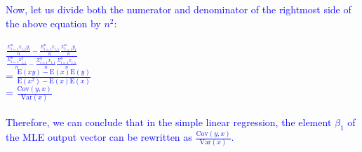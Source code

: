 \documentclass[letterpaper, 11pt]{article}
\begin{document}
\textcolor{blue}{
Now, let us divide both the numerator and denominator of the rightmost side of the above equation by $n^{2}$:\\\\
$\frac{\frac{\Sigma_{i=1}^{n}x_{i,1}y_{i}}{n} - \frac{\Sigma_{i=1}^{n}x_{i,1}}{n}\frac{\Sigma_{i=1}^{n}y_i}{n}}{\frac{\Sigma_{i=1}^{n}x^2_{i,1}}{n} - \frac{\Sigma_{i=1}^{n}x_{i,1}}{n}\frac{\Sigma_{i=1}^{n}x_{i,1}}{n}}$ \\
= $\frac{\mathrm{E}(xy) - \mathrm{E}(x)\mathrm{E}(y)}{\mathrm{E}(x^2) - \mathrm{E}(x)\mathrm{E}(x)}$ \\
= $\frac{\mathrm{Cov}(y, x)}{\mathrm{Var}(x)}$ \\\\
Therefore, we can conclude that in the simple linear regression, the element $\beta_1$ of the MLE output vector can be rewritten as $\frac{\mathrm{Cov}(y,x)}{\mathrm{Var}(x)}$.
}\\
\end{document}
